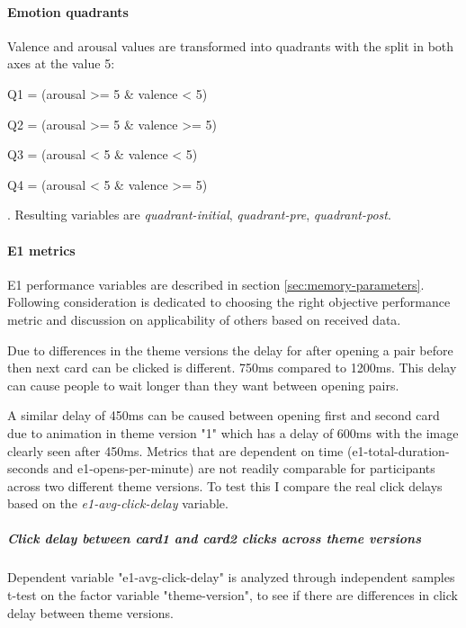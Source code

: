 	\paragraph{Emotion quadrants}
	
	Valence and arousal values are transformed into quadrants with the split in both axes at the value 5:
	\begin{enumerate*}
		\item Q1 = (arousal >= 5 \& valence  < 5)
		\item Q2 = (arousal >= 5 \& valence  >= 5)
		\item Q3 = (arousal < 5 \& valence  < 5)
		\item Q4 = (arousal < 5 \& valence  >= 5)
	\end{enumerate*}. Resulting variables are \textit{quadrant-initial}, \textit{quadrant-pre}, \textit{quadrant-post}.
	
	\paragraph{E1 metrics} \label{sec:e1metrics}
	
	E1 performance variables are described in section \ref{sec:memory-parameters}. Following consideration is dedicated to choosing the right objective performance metric and discussion on applicability of others based on received data.
	
	Due to differences in the theme versions the delay for after opening a pair before then next card can be clicked is different. 750ms compared to 1200ms. This delay can cause people to wait longer than they want between opening pairs.
	
	A similar delay of 450ms can be caused between opening first and second card due to animation in theme version "1" which has a delay of 600ms with the image clearly seen after 450ms. Metrics that are dependent on time (e1-total-duration-seconds and e1-opens-per-minute) are not readily comparable for participants across two different theme versions. To test this I compare the real click delays based on the \textit{e1-avg-click-delay} variable.

	\subparagraph{Click delay between card1 and card2 clicks across theme versions} Dependent variable "e1-avg-click-delay" is analyzed through independent samples t-test on the factor variable "theme-version", to see if there are differences in click delay between theme versions.
	
